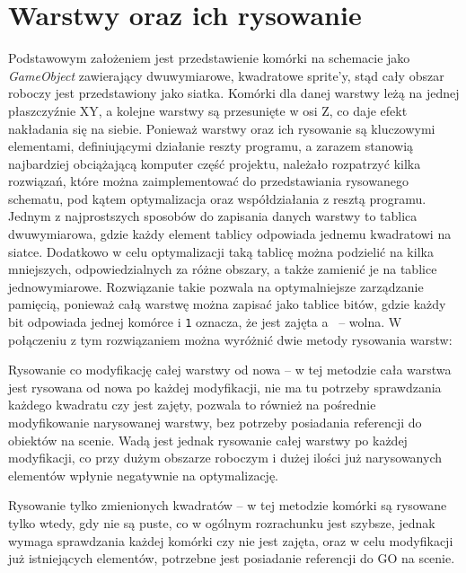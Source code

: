 \section{Warstwy oraz ich rysowanie}
\label{sec:warstwy_oraz_ich_rysowanie}

Podstawowym założeniem jest przedstawienie komórki na schemacie jako \textit{GameObject} zawierający dwuwymiarowe,
kwadratowe sprite'y,
stąd cały obszar roboczy jest przedstawiony jako siatka.
Komórki dla danej warstwy leżą na jednej płaszczyźnie XY, a kolejne warstwy są przesunięte w osi Z,
co daje efekt nakładania się na siebie.
Ponieważ warstwy oraz ich rysowanie są kluczowymi elementami, definiującymi działanie reszty programu,
a zarazem stanowią najbardziej obciążającą komputer część projektu,
należało rozpatrzyć kilka rozwiązań, które można zaimplementować do przedstawiania rysowanego schematu,
pod kątem optymalizacja oraz współdziałania z resztą programu.\\
\indent Jednym z najprostszych sposobów do zapisania danych warstwy to tablica dwuwymiarowa,
gdzie każdy element tablicy odpowiada jednemu kwadratowi na siatce.
Dodatkowo w celu optymalizacji taką tablicę można podzielić na kilka mniejszych,
odpowiedzialnych za różne obszary, a także zamienić je na tablice jednowymiarowe.
Rozwiązanie takie pozwala na optymalniejsze zarządzanie pamięcią,
ponieważ całą warstwę można zapisać jako tablice bitów,
gdzie każdy bit odpowiada jednej komórce i \texttt{1} oznacza,
że jest zajęta a~ -- wolna.
W połączeniu z tym rozwiązaniem można wyróżnić dwie metody rysowania warstw:

\begin{citemize}
    \item Rysowanie co modyfikację całej warstwy od nowa -- w tej metodzie cała warstwa jest rysowana od nowa po każdej modyfikacji,
    nie ma tu potrzeby sprawdzania każdego kwadratu czy jest zajęty, pozwala to również na pośrednie modyfikowanie narysowanej warstwy,
    bez potrzeby posiadania referencji do obiektów na scenie.
    Wadą jest jednak rysowanie całej warstwy po każdej modyfikacji,
    co przy dużym obszarze roboczym i dużej ilości już narysowanych elementów wpłynie negatywnie na optymalizację.
    \item Rysowanie tylko zmienionych kwadratów -- w tej metodzie komórki są rysowane tylko wtedy, gdy nie są puste,
    co w ogólnym rozrachunku jest szybsze, jednak wymaga sprawdzania każdej komórki czy nie jest zajęta,
    oraz w celu modyfikacji już istniejących elementów, potrzebne jest posiadanie referencji do GO na scenie.
\end{citemize}

